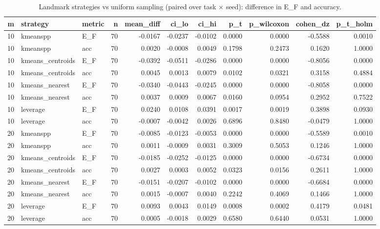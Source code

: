 \begin{table}
\caption{Landmark strategies vs uniform sampling (paired over task × seed): difference in E_F and accuracy.}
\label{tab:table_landmark_strategies}
\begin{tabular}{rllrrrrrrrr}
\toprule
m & strategy & metric & n & mean\_diff & ci\_lo & ci\_hi & p\_t & p\_wilcoxon & cohen\_dz & p\_t\_holm \\
\midrule
10 & kmeanspp & E\_F & 70 & -0.0167 & -0.0237 & -0.0102 & 0.0000 & 0.0000 & -0.5588 & 0.0010 \\
10 & kmeanspp & acc & 70 & 0.0020 & -0.0008 & 0.0049 & 0.1798 & 0.2473 & 0.1620 & 1.0000 \\
10 & kmeans\_centroids & E\_F & 70 & -0.0392 & -0.0511 & -0.0286 & 0.0000 & 0.0000 & -0.8056 & 0.0000 \\
10 & kmeans\_centroids & acc & 70 & 0.0045 & 0.0013 & 0.0079 & 0.0102 & 0.0321 & 0.3158 & 0.4884 \\
10 & kmeans\_nearest & E\_F & 70 & -0.0340 & -0.0443 & -0.0245 & 0.0000 & 0.0000 & -0.8058 & 0.0000 \\
10 & kmeans\_nearest & acc & 70 & 0.0037 & 0.0009 & 0.0067 & 0.0160 & 0.0954 & 0.2952 & 0.7522 \\
10 & leverage & E\_F & 70 & 0.0240 & 0.0108 & 0.0391 & 0.0017 & 0.0019 & 0.3898 & 0.0930 \\
10 & leverage & acc & 70 & -0.0007 & -0.0042 & 0.0026 & 0.6896 & 0.8480 & -0.0479 & 1.0000 \\
20 & kmeanspp & E\_F & 70 & -0.0085 & -0.0123 & -0.0053 & 0.0000 & 0.0000 & -0.5589 & 0.0010 \\
20 & kmeanspp & acc & 70 & 0.0011 & -0.0009 & 0.0031 & 0.3009 & 0.5053 & 0.1246 & 1.0000 \\
20 & kmeans\_centroids & E\_F & 70 & -0.0185 & -0.0252 & -0.0125 & 0.0000 & 0.0000 & -0.6734 & 0.0000 \\
20 & kmeans\_centroids & acc & 70 & 0.0027 & 0.0003 & 0.0052 & 0.0323 & 0.0156 & 0.2611 & 1.0000 \\
20 & kmeans\_nearest & E\_F & 70 & -0.0151 & -0.0207 & -0.0102 & 0.0000 & 0.0000 & -0.6684 & 0.0000 \\
20 & kmeans\_nearest & acc & 70 & 0.0015 & -0.0007 & 0.0040 & 0.2242 & 0.4069 & 0.1466 & 1.0000 \\
20 & leverage & E\_F & 70 & 0.0093 & 0.0043 & 0.0149 & 0.0008 & 0.0002 & 0.4179 & 0.0481 \\
20 & leverage & acc & 70 & 0.0005 & -0.0018 & 0.0029 & 0.6580 & 0.6440 & 0.0531 & 1.0000 \\

\end{tabular}
\end{table}
